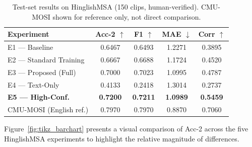 \begin{table}[ht]
\centering
\caption{Test-set results on HinglishMSA (150 clips, human-verified). CMU-MOSI shown for reference only, not direct comparison.}
\label{tab:main_results}
\renewcommand{\arraystretch}{1.3}
\begin{tabular}{lcccc}
\toprule
\textbf{Experiment} & \textbf{Acc-2} $\uparrow$ & \textbf{F1} $\uparrow$ & \textbf{MAE} $\downarrow$ & \textbf{Corr} $\uparrow$ \\
\midrule
E1 --- Baseline              & 0.6467 & 0.6493 & 1.2271 & 0.3895 \\
E2 --- Standard Training     & 0.6667 & 0.6688 & 1.1724 & 0.4520 \\
E3 --- Proposed (Full)       & 0.7000 & 0.7023 & 1.0995 & 0.4787 \\
E4 --- Text-Only             & 0.4133 & 0.2418 & 1.3014 & 0.2737 \\
\textbf{E5 --- High-Conf.}   & \textbf{0.7200} & \textbf{0.7211} & \textbf{1.0989} & \textbf{0.5459} \\
\midrule
CMU-MOSI \cite{zadeh2016mosi} (English ref.) & 0.7970 & 0.7970 & 0.8870 & 0.7060 \\
\bottomrule
\end{tabular}
\end{table}

Figure~\ref{fig:tikz_barchart} presents a visual comparison of Acc-2 across the five HinglishMSA experiments to highlight the relative magnitude of differences.

